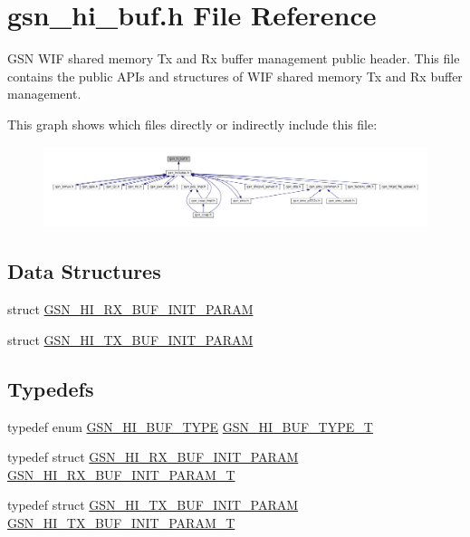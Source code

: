 \hypertarget{a00505}{
\section{gsn\_\-hi\_\-buf.h File Reference}
\label{a00505}
}


GSN WIF shared memory Tx and Rx buffer management public header. This file contains the public APIs and structures of WIF shared memory Tx and Rx buffer management.  


This graph shows which files directly or indirectly include this file:
\nopagebreak
\begin{figure}[H]
\begin{center}
\leavevmode
\includegraphics[width=400pt]{a00736}
\end{center}
\end{figure}
\subsection*{Data Structures}
\begin{DoxyCompactItemize}
\item 
struct \hyperlink{a00090}{GSN\_\-HI\_\-RX\_\-BUF\_\-INIT\_\-PARAM}
\item 
struct \hyperlink{a00091}{GSN\_\-HI\_\-TX\_\-BUF\_\-INIT\_\-PARAM}
\end{DoxyCompactItemize}
\subsection*{Typedefs}
\begin{DoxyCompactItemize}
\item 
typedef enum \hyperlink{a00505_af1aed68d5f6d2f9a744d8de12b9adbbe}{GSN\_\-HI\_\-BUF\_\-TYPE} \hyperlink{a00505_a9d5b1f6ad823b77a15f4d0e02f96e4ea}{GSN\_\-HI\_\-BUF\_\-TYPE\_\-T}
\item 
typedef struct \hyperlink{a00090}{GSN\_\-HI\_\-RX\_\-BUF\_\-INIT\_\-PARAM} \hyperlink{a00505_a167c1fbff0676dbb63af937f637cc207}{GSN\_\-HI\_\-RX\_\-BUF\_\-INIT\_\-PARAM\_\-T}
\item 
typedef struct \hyperlink{a00091}{GSN\_\-HI\_\-TX\_\-BUF\_\-INIT\_\-PARAM} \hyperlink{a00505_ae0bc0c176070bfb57aa0b92ee170f66a}{GSN\_\-HI\_\-TX\_\-BUF\_\-INIT\_\-PARAM\_\-T}
\end{DoxyCompactItemize}
